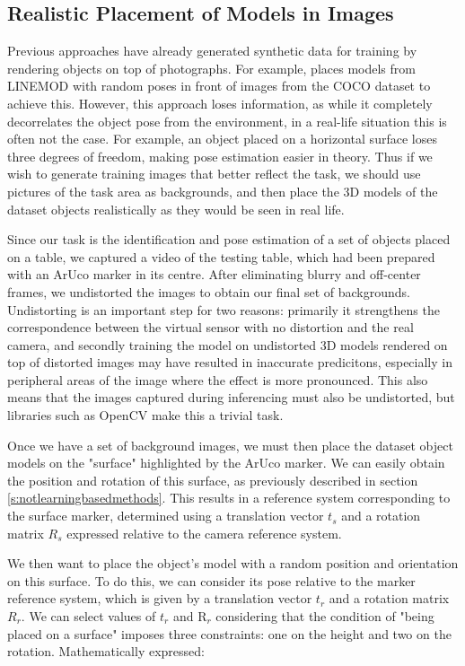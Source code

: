 \subsection{Realistic Placement of Models in Images}

Previous approaches have already generated synthetic data for training by rendering objects on top of photographs. For example, \cite{DPOD} places models from LINEMOD with random poses in front of images from the COCO dataset to achieve this. However, this approach loses information, as while it completely decorrelates the object pose from the environment, in a real-life situation this is often not the case. For example, an object placed on a horizontal surface loses three degrees of freedom, making pose estimation easier in theory. Thus if we wish to generate training images that better reflect the task, we should use pictures of the task area as backgrounds, and then place the 3D models of the dataset objects realistically as they would be seen in real life.

Since our task is the identification and pose estimation of a set of objects placed on a table, we captured a video of the testing table, which had been prepared with an ArUco marker in its centre. After eliminating blurry and off-center frames, we undistorted the images to obtain our final set of backgrounds. Undistorting is an important step for two reasons: primarily it strengthens the correspondence between the virtual sensor with no distortion and the real camera, and secondly training the model on undistorted 3D models rendered on top of distorted images may have resulted in inaccurate predicitons, especially in peripheral areas of the image where the effect is more pronounced. This also means that the images captured during inferencing must also be undistorted, but libraries such as OpenCV make this a trivial task.

Once we have a set of background images, we must then place the dataset object models on the "surface" highlighted by the ArUco marker. We can easily obtain the position and rotation of this surface, as previously described in section \ref*{s:notlearningbasedmethods}. This results in a reference system corresponding to the surface marker, determined using a translation vector $t_s$ and a rotation matrix $R_s$ expressed relative to the camera reference system.

We then want to place the object's model with a random position and orientation on this surface. To do this, we can consider its pose relative to the marker reference system, which is given by a translation vector $t_r$ and a rotation matrix $R_r$. We can select values of $t_r$ and $\text{R}_r$ considering that the condition of "being placed on a surface" imposes three constraints: one on the height and two on the rotation. Mathematically expressed:

